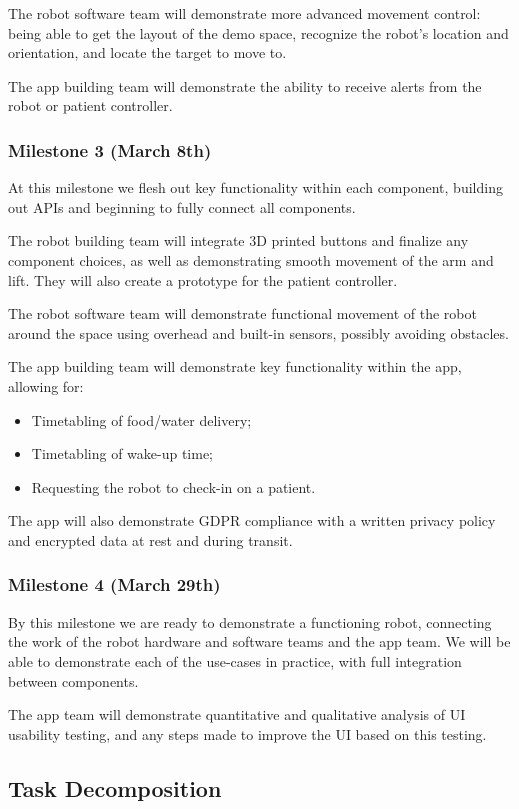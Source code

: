 \documentclass{article}
\begin{document}
The robot software team will demonstrate more advanced movement control: being able to get the layout of the demo space, recognize the robot's location and orientation, and locate the target to move to. 

The app building team will demonstrate the ability to receive alerts from the robot or patient controller. 

\subsubsection{Milestone 3 (March 8th)}
At this milestone we flesh out key functionality within each component, building out APIs and beginning to fully connect all components. 

The robot building team will integrate 3D printed buttons and finalize any component choices, as well as demonstrating smooth movement of the arm and lift. They will also create a prototype for the patient controller. 

The robot software team will demonstrate functional movement of the robot around the space using overhead and built-in sensors, possibly avoiding obstacles. 

The app building team will demonstrate key functionality within the app, allowing for:
\begin{itemize}
\item Timetabling of food/water delivery;
\item Timetabling of wake-up time;
\item Requesting the robot to check-in on a patient.
\end{itemize}
The app will also demonstrate GDPR compliance with a written privacy policy and encrypted data at rest and during transit.

\subsubsection{Milestone 4 (March 29th)}
By this milestone we are ready to demonstrate a functioning robot, connecting the work of the robot hardware and software teams and the app team. We will be able to demonstrate each of the use-cases in practice, with full integration between components.

The app team will demonstrate quantitative and qualitative analysis of UI usability testing, and any steps made to improve the UI based on this testing.

\subsection{Task Decomposition}
\end{document}
